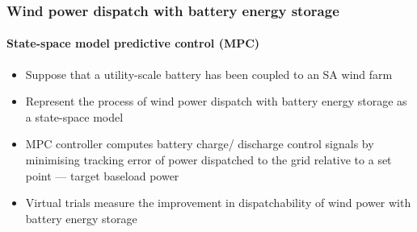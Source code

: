 \documentclass[handout, smaller, xcolor=table]{beamer}			%
\begin{document}
\begin{frame}
	\frametitle{Wind power dispatch with battery energy storage}
	\framesubtitle{State-space model predictive control (MPC)}

	\hspace{-1.5em}
	\begin{minipage}{0.57\linewidth}
		\begin{itemize}
			\item  Suppose that a utility-scale battery has been coupled to an SA wind farm
			\item  Represent the process of wind power dispatch with battery energy storage as a state-space model
			\item  MPC controller computes battery charge/ discharge control signals by minimising tracking error of power dispatched to the grid relative to a set point --- target baseload power
			\item	 Virtual trials measure the improvement in dispatchability of wind power with battery energy storage
		\end{itemize}
	\end{minipage}%
	\begin{minipage}{0.43\linewidth}
\end{minipage}
\end{frame}
\end{document}
